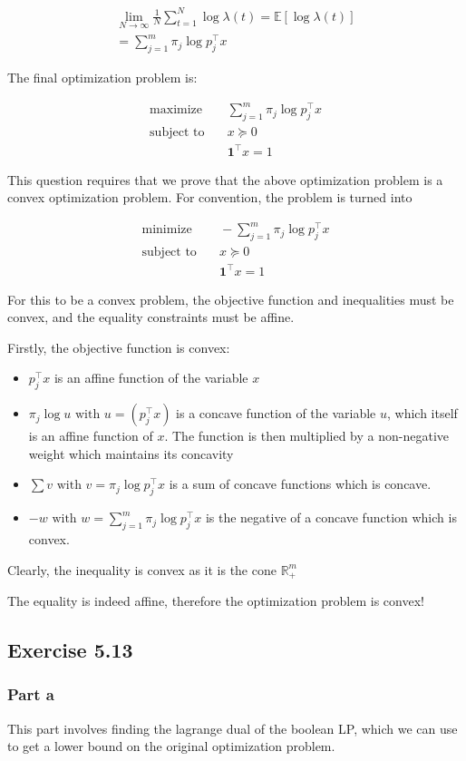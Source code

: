 \begin{equation}
  \begin{aligned}
    \lim_{N \to \infty} \frac{1}{N} \sum_{t=1}^N \log \lambda(t) = \mathbb{E}[\log \lambda(t)] \\ 
    = \sum_{j=1}^m \pi_j \log p_j^\top x
  \end{aligned}
\end{equation}

The final optimization problem is:

\begin{align}
  \text{maximize} & \quad \sum_{j=1}^m \pi_j \log p_j^\top x \\
  \text{subject to} & \quad x \succeq 0  \\
  & \quad \textbf{1}^\top x = 1
\end{align}

This question requires that we prove that the above optimization problem is a convex optimization problem. For convention, the problem is turned into

\begin{align}
  \text{minimize} & \quad -\sum_{j=1}^m \pi_j \log p_j^\top x \\
  \text{subject to} & \quad x \succeq 0  \\
  & \quad \textbf{1}^\top x = 1
\end{align}

For this to be a convex problem, the objective function and inequalities must be convex, and the equality constraints must be affine.

Firstly, the objective function is convex:
\begin{itemize}
  \item $p_j^\top x $ is an affine function of the variable $x$
  \item $ \pi_j \log u \text{ with } u = (p_j^\top x)$ is a concave function of the variable $u$, which itself is an affine function of $x$. The function is then multiplied by a non-negative weight which maintains its concavity
  \item $\sum v \text{ with } v = \pi_j \log p_j^\top x$ is a sum of concave functions which is concave.
  \item $- w \text{ with } w = \sum_{j=1}^m \pi_j \log p_j^\top x$ is the negative of a concave function which is convex.
\end{itemize}

Clearly, the inequality is convex as it is the cone $\mathbb{R}^m_{+}$

The equality is indeed affine, therefore the optimization problem is convex!

\subsection{Exercise 5.13}
\subsubsection{Part a}
This part involves finding the lagrange dual of the boolean LP, which we can use to get a lower bound on the original optimization problem.

